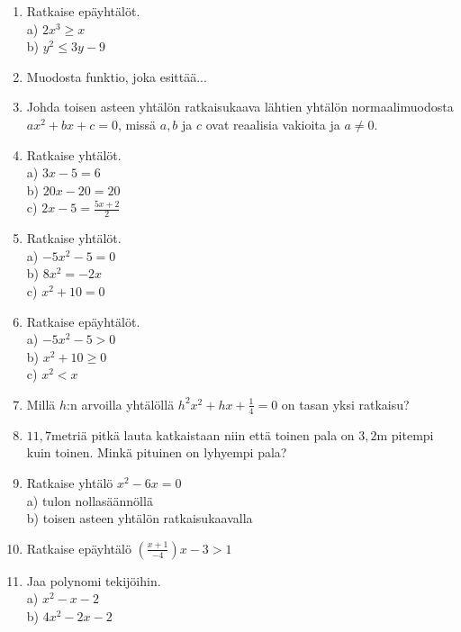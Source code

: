 \begin{enumerate}


\item Ratkaise epäyhtälöt. \\
a) $2x^3 \geq x$ \\
b) $y^2 \leq 3y -9 $

\item Muodosta funktio, joka esittää...

\item Johda toisen asteen yhtälön ratkaisukaava lähtien yhtälön normaalimuodosta $ax^2+bx+c=0$, missä $a, b$ ja $c$ ovat reaalisia vakioita ja $a \neq 0$.
\item Ratkaise yhtälöt.\\ a) $3x-5=6$\\ b) $20x-20=20$\\ c) $2x-5=\frac{5x+2}{2}$
\item Ratkaise yhtälöt.\\ a) $-5x^2-5=0$\\ b) $8x^2=-2x$\\ c) $x^2+10=0$
\item Ratkaise epäyhtälöt.\\ a) $-5x^2-5>0$\\ b) $x^2+10\geq0$\\ c) $x^2<x$
\item Millä $h$:n arvoilla yhtälöllä $h^2x^2+hx+\frac{1}{4}=0$ on tasan yksi ratkaisu?
\item $11,7$metriä pitkä lauta katkaistaan niin että toinen pala on $3,2$m pitempi kuin toinen. Minkä pituinen on lyhyempi pala?
\item Ratkaise yhtälö $x^2-6x=0$\\ a) tulon nollasäännöllä\\ b) toisen asteen yhtälön ratkaisukaavalla
\item Ratkaise epäyhtälö $(\frac{x+1}{-4})x-3>1$
\item Jaa polynomi tekijöihin.\\ a) $x^2-x-2$\\ b) $4x^2-2x-2$


\end{enumerate}

